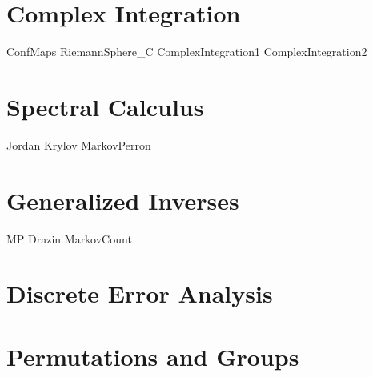 \documentclass{newsiambook}
\begin{document}
\part{Complex Integration}
{ConfMaps}
{RiemannSphere_C}
{ComplexIntegration1}
{ComplexIntegration2}

\part{Spectral Calculus}
{Jordan}
{Krylov}
{MarkovPerron}

\part{Generalized Inverses}
{MP}
{Drazin}
{MarkovCount}

\part{Discrete Error Analysis}

\part{Permutations and Groups}










\end{document}
